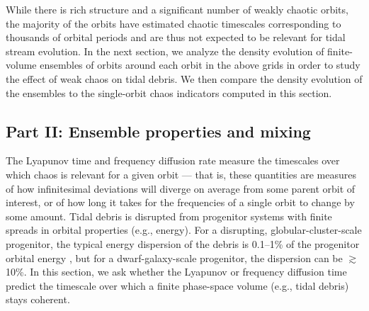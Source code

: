 \documentclass[letterpaper,12pt,preprint]{aastex}
\newcommand{\msun}{\ensuremath{\mathrm{M}_\odot}}
\begin{document}
While there is rich structure and a significant number of weakly chaotic orbits, the majority of the orbits have estimated chaotic timescales corresponding to thousands of orbital periods and are thus not expected to be relevant for tidal stream evolution. In the next section, we analyze the density evolution of finite-volume ensembles of orbits around each orbit in the above grids in order to study the effect of weak chaos on tidal debris. We then compare the density evolution of the ensembles to the single-orbit chaos indicators computed in this section.

\subsection{Part II: Ensemble properties and mixing} \label{sec:results2}

The Lyapunov time and frequency diffusion rate measure the timescales over which chaos is relevant for a given orbit --- that is, these quantities are measures of how infinitesimal deviations will diverge on average from some parent orbit of interest, or of how long it takes for the frequencies of a single orbit to change by some amount. Tidal debris is disrupted from progenitor systems with finite spreads in orbital properties (e.g., energy). For a disrupting, globular-cluster-scale progenitor, the typical energy dispersion of the debris is 0.1--1\% of the progenitor orbital energy \citep[assuming masses of $10^4$--$10^5$~\msun;][]{johnston98}, but for a dwarf-galaxy-scale progenitor, the dispersion can be $\gtrsim$10\%. In this section, we ask whether  the Lyapunov or frequency diffusion time predict the timescale over which a finite phase-space volume (e.g., tidal debris) stays coherent.
\end{document}
